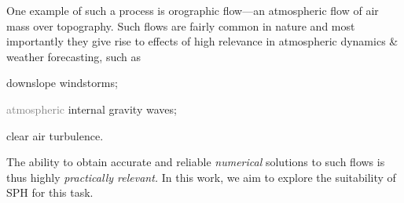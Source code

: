 \documentclass[../main.tex]{subfiles}
\begin{document}
One example of such a process is orographic flow---an atmospheric flow of air mass over topography. Such flows are fairly common in nature and most importantly they give rise to effects of high relevance in atmospheric dynamics \& weather forecasting, such as

\begin{compactenum}
	\item downslope windstorms;
	\item \textcolor{gray}{atmospheric} internal gravity waves\sidenotemark;
	\item clear air turbulence.
\end{compactenum}


The ability to obtain accurate and reliable \emph{numerical} solutions to such flows is thus highly \emph{practically relevant. \sidenotemark}  In this work, we aim to explore the suitability of SPH for this task.
\end{document}

